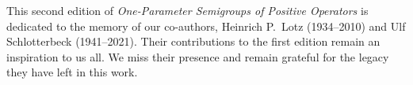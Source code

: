 %
%

\begin{dedication}
{\RaggedRight\Large 
This second edition of \emph{One-Parameter Semigroups of Positive Operators} is dedicated to the memory 	of our 
co-authors, Heinrich P.~Lotz (1934--2010) and Ulf Schlotterbeck (1941--2021). 
Their contributions to the first edition remain an inspiration to us all. 
We miss their presence and remain grateful for the legacy they have left in this work.}
\end{dedication}





